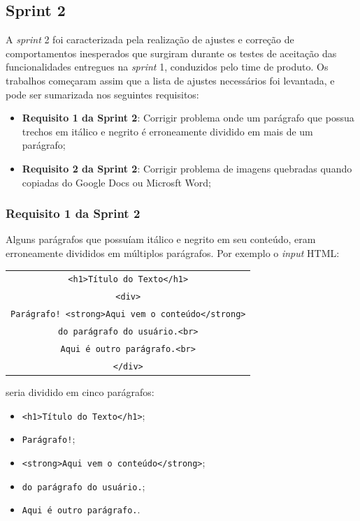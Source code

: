 \subsection {Sprint 2}

A \textit{sprint} 2 foi caracterizada pela realização de ajustes e correção de comportamentos inesperados que surgiram durante os testes de aceitação das funcionalidades entregues na \textit{sprint} 1, conduzidos pelo time de produto. Os trabalhos começaram assim que a lista de ajustes necessários foi levantada, e pode ser sumarizada nos seguintes requisitos:

\begin{itemize}
	\item \textbf{Requisito 1 da Sprint 2}: Corrigir problema onde um parágrafo que possua trechos em itálico e negrito é erroneamente dividido em mais de um parágrafo;
	\item \textbf{Requisito 2 da Sprint 2}: Corrigir problema de imagens quebradas quando copiadas do Google Docs ou Microsft Word;
\end{itemize}

\subsubsection {Requisito 1 da Sprint 2}

Alguns parágrafos que possuíam itálico e negrito em seu conteúdo, eram erroneamente divididos em múltiplos parágrafos. Por exemplo o \textit{input} HTML:

\begin{table}[h]
	\begin{tabular}{c}
		\texttt{<h1>Título do Texto</h1>}\\
		\texttt{<div>}\\
			\texttt{Parágrafo! <strong>Aqui vem o conteúdo</strong>}\\
			\texttt{do parágrafo do usuário.<br>}\\
			\texttt{Aqui é outro parágrafo.<br>}\\
		\texttt{</div>}\\
	\end{tabular}
\end{table}

seria dividido em cinco parágrafos:

\begin{itemize}
	\item \texttt{<h1>Título do Texto</h1>};
	\item \texttt{Parágrafo!};
	\item \texttt{<strong>Aqui vem o conteúdo</strong>};
	\item \texttt{do parágrafo do usuário.};
	\item \texttt{Aqui é outro parágrafo.}.
\end{itemize}

